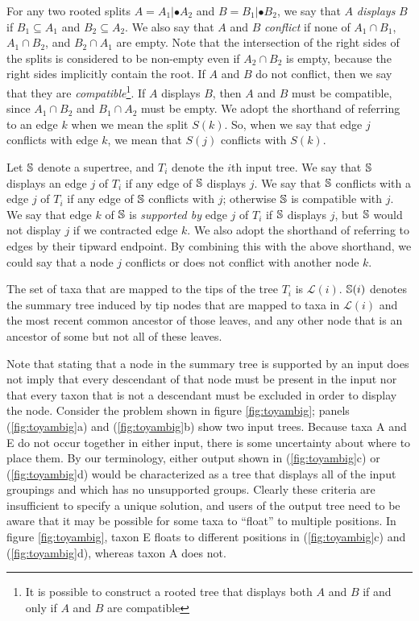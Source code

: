 \documentclass[fleqn,12pt,lineno,english]{wlpeerj}
\begin{document}
For any two rooted splits $A=A_{1}|\bullet A_{2}$ and $B=B_{1}|\bullet B_{2}$,
we say that $A$ \emph{displays} $B$ if $B_{1}\subseteq A_{1}$ and
$B_{2}\subseteq A_{2}$. We also say that $A$ and $B$ \emph{conflict}
if none of $A_{1}\cap B_{1}$, $A_{1}\cap B_{2}$, and $B_{2}\cap A_{1}$
are empty.
Note that the intersection of the right sides of the splits is considered to
be non-empty even if $A_{2}\cap B_{2}$ is empty, because the right
sides implicitly contain the root. If $A$ and $B$ do not conflict, then we say that they are \emph{compatible}\footnote{It is possible to construct a rooted tree that displays both $A$
and $B$ if and only if $A$ and $B$ are compatible}. If $A$ displays $B$, then $A$ and $B$ must be compatible, since
$A_{1}\cap B_{2}$ and $B_{1}\cap A_{2}$ must be empty. We adopt
the shorthand of referring to an edge $k$ when we mean the split
$S(k)$. So, when we say that edge $j$ conflicts with edge $k$,
we mean that $S(j)$ conflicts with $S(k)$. 

Let $\mathbb{S}$ denote a supertree, and $T_{i}$ denote the $i$th
input tree. We say that $\mathbb{S}$ displays an edge $j$ of $T_{i}$
if any edge of $\mathbb{S}$ displays $j$. We say that $\mathbb{S}$
conflicts with a edge $j$ of $T_{i}$ if any edge of $\mathbb{S}$
conflicts with $j$; otherwise $\mathbb{S}$ is compatible with
$j$. We say that edge $k$ of $\mathbb{S}$ is \emph{supported
by} edge $j$ of $T_{i}$ if $\mathbb{S}$ displays $j$, but $\mathbb{S}$
would not display $j$ if we contracted edge $k$. We also adopt the
shorthand of referring to edges by their tipward endpoint. By combining
this with the above shorthand, we could say that a node $j$ conflicts
or does not conflict with another node $k$.

The set of taxa that are mapped to the tips of the tree $T_{i}$ is
$\mathcal{L}(i)$. $\mathbb{S}(i)$ denotes the summary tree induced
by tip nodes that are mapped to taxa in $\mathcal{L}(i)$ and the
most recent common ancestor of those leaves, and any other node that
is an ancestor of some but not all of these leaves. 

Note that stating that a node in the summary tree is supported by
an input does not imply that every descendant of that node must be
present in the input nor that every taxon that is not a descendant
must be excluded in order to display the node. Consider the problem
shown in figure \ref{fig:toyambig}; panels (\ref{fig:toyambig}a)
and (\ref{fig:toyambig}b) show two input trees. Because taxa A and
E do not occur together in either input, there is some uncertainty
about where to place them. By our terminology, either output shown
in (\ref{fig:toyambig}c) or (\ref{fig:toyambig}d) would be characterized
as a tree that displays all of the input groupings and which has no
unsupported groups. Clearly these criteria are insufficient to specify
a unique solution, and users of the output tree need to be aware that
it may be possible for some taxa to ``float'' to multiple positions.
In figure \ref{fig:toyambig}, taxon E floats to different positions
in (\ref{fig:toyambig}c) and (\ref{fig:toyambig}d), whereas taxon
A does not. 
\end{document}
